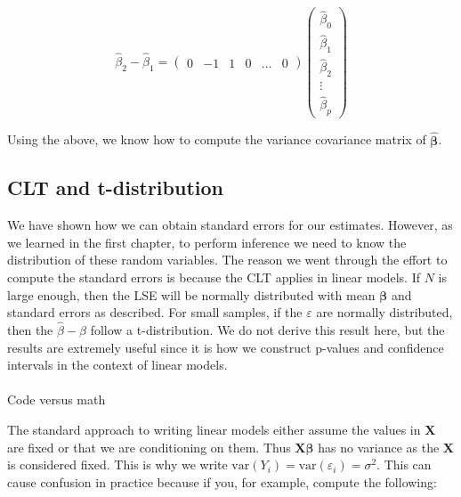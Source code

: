 \documentclass[
  letterpaper,
  DIV=11,
  numbers=noendperiod]{scrartcl}
\makeatletter
\let\oldparagraph\paragraph
\renewcommand{\paragraph}{
    \@ifstar
      \xxxParagraphStar
      \xxxParagraphNoStar
  }
\newcommand{\xxxParagraphStar}[1]{\oldparagraph*{#1}\mbox{}}
\newcommand{\xxxParagraphNoStar}[1]{\oldparagraph{#1}\mbox{}}
\newenvironment{Shaded}{\begin{snugshade}}{\end{snugshade}}
\newcommand{\DecValTok}[1]{\textcolor[rgb]{0.68,0.00,0.00}{#1}}
\newcommand{\FloatTok}[1]{\textcolor[rgb]{0.68,0.00,0.00}{#1}}
\newcommand{\FunctionTok}[1]{\textcolor[rgb]{0.28,0.35,0.67}{#1}}
\newcommand{\NormalTok}[1]{\textcolor[rgb]{0.00,0.23,0.31}{#1}}
\newcommand{\OtherTok}[1]{\textcolor[rgb]{0.00,0.23,0.31}{#1}}
\newcommand{\SpecialCharTok}[1]{\textcolor[rgb]{0.37,0.37,0.37}{#1}}
\makeatother
\begin{document}
\[\hat{\beta}_2 - \hat{\beta}_1 = 
\begin{pmatrix}0&-1&1&0&\dots&0\end{pmatrix} \begin{pmatrix}
\hat{\beta}_0\\
\hat{\beta}_1 \\ 
\hat{\beta}_2 \\ 
\vdots\\
\hat{\beta}_p
\end{pmatrix}\]

Using the above, we know how to compute the variance covariance matrix
of \(\hat{\boldsymbol{\beta}}\).

\subsection{CLT and t-distribution}\label{clt-and-t-distribution}

We have shown how we can obtain standard errors for our estimates.
However, as we learned in the first chapter, to perform inference we
need to know the distribution of these random variables. The reason we
went through the effort to compute the standard errors is because the
CLT applies in linear models. If \(N\) is large enough, then the LSE
will be normally distributed with mean \(\boldsymbol{\beta}\) and
standard errors as described. For small samples, if the \(\varepsilon\)
are normally distributed, then the \(\hat{\beta}-\beta\) follow a
t-distribution. We do not derive this result here, but the results are
extremely useful since it is how we construct p-values and confidence
intervals in the context of linear models.

\paragraph{Code versus math}\label{code-versus-math}

The standard approach to writing linear models either assume the values
in \(\mathbf{X}\) are fixed or that we are conditioning on them. Thus
\(\mathbf{X} \boldsymbol{\beta}\) has no variance as the \(\mathbf{X}\)
is considered fixed. This is why we write
\(\mbox{var}(Y_i) = \mbox{var}(\varepsilon_i)=\sigma^2\). This can cause
confusion in practice because if you, for example, compute the
following:

\begin{Shaded}
\end{Shaded}
\end{document}
